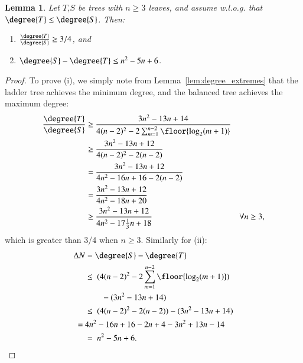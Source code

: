 \documentclass[]{elsarticle}
\newtheorem{lem}[thm]{Lemma}
\begin{document}
\begin{lem}
	\label{lem:degree_max_delta}
	Let $T$,$S$ be trees with $n \ge 3$ leaves, and assume w.l.o.g. that $\degree{T} \le \degree{S}$.
	Then:
	\begin{enumerate}
		\item $\frac{\degree{T}}{\degree{S}} \ge 3/4$, and
		\item $\degree{S} - \degree{T} \le n^2 - 5n + 6$.
	\end{enumerate}
\end{lem}
\begin{proof}
	To prove (i), we simply note from Lemma~\ref{lem:degree_extremes} that the ladder tree achieves the minimum degree, and the balanced tree achieves the maximum degree:
	\begin{align*}
		\frac{\degree{T}}{\degree{S}} \ge\ &\frac{3n^2 - 13n + 14}{4(n-2)^2 - 2 \sum_{m=1}^{n-2} \floor{\log_2(m+1)}} \\
		\ge\ &\frac{3n^2 - 13n + 12}{4(n-2)^2 - 2(n-2)} \\
		= \ &\frac{3n^2 - 13n + 12}{4n^2 - 16n + 16 - 2(n-2)} \\
		= \ &\frac{3n^2 - 13n + 12}{4n^2 - 18n + 20} \\
		\ge\ &\frac{3n^2 - 13n + 12}{4n^2 - 17\frac{1}{3}n + 18} &\forall n \ge 3, \\
	\end{align*}
	which is greater than 3/4 when $n \ge 3$.
    Similarly for (ii):
	\begin{align*}
		{\Delta}N &= \degree{S} - \degree{T} \\
		&\le\ (4(n-2)^2 - 2 \sum_{m=1}^{n-2} \floor{\log_2(m+1)}) \\
		&\ \ \ \ \ \ \ \ - (3n^2 - 13n + 14) \\
		&\le\ (4(n-2)^2 - 2(n-2)) - (3n^2 - 13n + 14) \\
		=\ &4n^2 - 16n + 16 - 2n +4 - 3n^2 + 13n - 14 \\
		&=\ n^2 - 5n + 6.
	\end{align*}
\end{proof}
\end{document}
